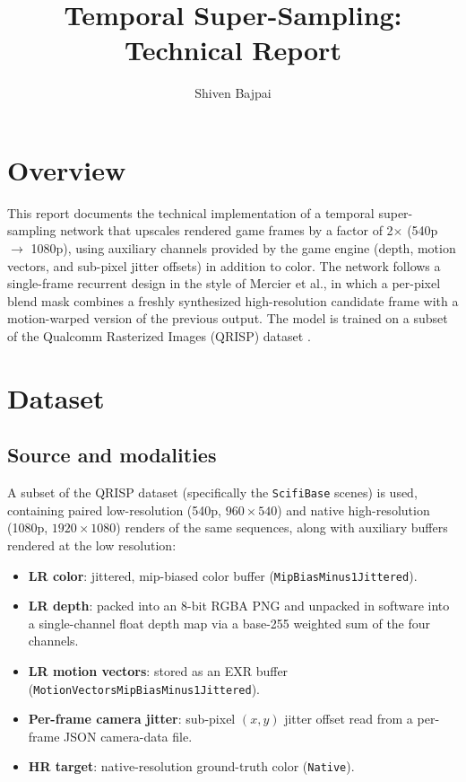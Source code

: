 \documentclass[11pt]{article}
\title{\vspace{-1.5em}Temporal Super-Sampling: Technical Report}
\author{Shiven Bajpai}
\date{}
\begin{document}
\maketitle
\vspace{-2.5em}

\section{Overview}
This report documents the technical implementation of a temporal super-sampling network that upscales rendered game frames by a factor of 2$\times$ (540p $\rightarrow$ 1080p), using auxiliary channels provided by the game engine (depth, motion vectors, and sub-pixel jitter offsets) in addition to color. The network follows a single-frame recurrent design in the style of Mercier et al.\cite{mercier2023}, in which a per-pixel blend mask combines a freshly synthesized high-resolution candidate frame with a motion-warped version of the previous output. The model is trained on a subset of the Qualcomm Rasterized Images (QRISP) dataset \cite{qrisp}.

\section{Dataset}

\subsection{Source and modalities}
A subset of the QRISP dataset (specifically the \texttt{ScifiBase} scenes) is used, containing paired low-resolution (540p, $960\times540$) and native high-resolution (1080p, $1920\times1080$) renders of the same sequences, along with auxiliary buffers rendered at the low resolution:

\begin{itemize}[itemsep=2pt]
    \item \textbf{LR color}: jittered, mip-biased color buffer (\texttt{MipBiasMinus1Jittered}).
    \item \textbf{LR depth}: packed into an 8-bit RGBA PNG and unpacked in software into a single-channel float depth map via a base-255 weighted sum of the four channels.
    \item \textbf{LR motion vectors}: stored as an EXR buffer (\texttt{MotionVectorsMipBiasMinus1Jittered}).
    \item \textbf{Per-frame camera jitter}: sub-pixel $(x,y)$ jitter offset read from a per-frame JSON camera-data file.
    \item \textbf{HR target}: native-resolution ground-truth color (\texttt{Native}).
\end{itemize}
\end{document}
